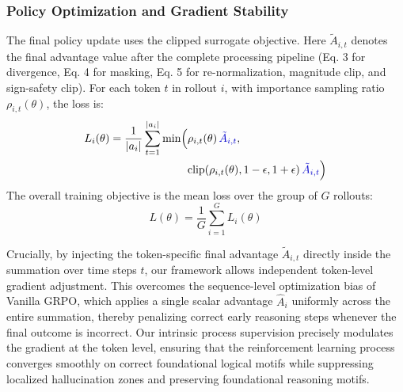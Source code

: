 \documentclass[conference]{IEEEtran}
\begin{document}
\subsubsection{Policy Optimization and Gradient Stability}
The final policy update uses the clipped surrogate objective. Here $\tilde{A}_{i,t}$ denotes the final advantage value after the complete processing pipeline (Eq. 3 for divergence, Eq. 4 for masking, Eq. 5 for re-normalization, magnitude clip, and sign-safety clip). For each token $t$ in rollout $i$, with importance sampling ratio $\rho_{i,t}(\theta)$, the loss is:
\begin{equation}
\begin{aligned}
L_i(\theta) = \frac{1}{|a_i|} \sum_{t=1}^{|a_i|}
\min \Bigl(
&\rho_{i,t}(\theta)\,\textcolor{blue!80!black}{\tilde{A}_{i,t}}, \\
&\mathrm{clip}(\rho_{i,t}(\theta), 1-\epsilon, 1+\epsilon)\,
\textcolor{blue!80!black}{\tilde{A}_{i,t}}
\Bigr)
\end{aligned}
\end{equation}
The overall training objective is the mean loss over the group of $G$ rollouts:
\begin{equation}
L(\theta) = \frac{1}{G} \sum_{i=1}^G L_i(\theta)
\end{equation}

Crucially, by injecting the token-specific final advantage $\tilde{A}_{i,t}$ directly inside the summation over time steps $t$, our framework allows independent token-level gradient adjustment. This overcomes the sequence-level optimization bias of Vanilla GRPO, which applies a single scalar advantage $\hat{A}_i$ uniformly across the entire summation, thereby penalizing correct early reasoning steps whenever the final outcome is incorrect. Our intrinsic process supervision precisely modulates the gradient at the token level, ensuring that the reinforcement learning process converges smoothly on correct foundational logical motifs while suppressing localized hallucination zones and preserving foundational reasoning motifs.
\end{document}
